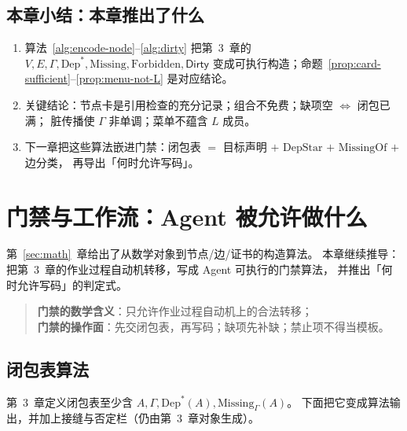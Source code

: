 \documentclass[UTF8,a4paper,11pt]{ctexart}
\theoremstyle{definition}
\theoremstyle{plain}
\theoremstyle{remark}
\numberwithin{figure}{section}
\numberwithin{table}{section}
\begin{document}
\subsection{本章小结：本章推出了什么}
\label{sec:math-summary}

\begin{enumerate}
  \item 算法~\ref{alg:encode-node}--\ref{alg:dirty} 把第~3~章的 $V,E,\Gamma,\mathrm{Dep}^*,\mathrm{Missing},\mathrm{Forbidden},\mathsf{Dirty}$
        变成可执行构造；命题~\ref{prop:card-sufficient}--\ref{prop:menu-not-L} 是对应结论。
  \item 关键结论：节点卡是引用检查的充分记录；组合不免费；缺项空 $\Leftrightarrow$ 闭包已满；
        脏传播使 $\Gamma$ 非单调；菜单不蕴含 $L$ 成员。
  \item 下一章把这些算法嵌进门禁：闭包表 $=$ 目标声明 $+$ $\mathrm{DepStar}$ $+$ $\mathrm{MissingOf}$ $+$ 边分类，
        再导出「何时允许写码」。
\end{enumerate}

\section{门禁与工作流：Agent 被允许做什么}
\label{sec:gates}

第~\ref{sec:math}~章给出了从数学对象到节点/边/证书的构造算法。
本章继续推导：把第~3~章的作业过程自动机转移，写成 Agent 可执行的门禁算法，
并推出「何时允许写码」的判定式。

\begin{quote}
\noindent
\textbf{门禁的数学含义}：只允许作业过程自动机上的合法转移；\\
\textbf{门禁的操作面}：先交闭包表，再写码；缺项先补缺；禁止项不得当模板。
\end{quote}

\subsection{闭包表算法}
\label{sec:gates-closure-algo}

第~3~章定义闭包表至少含 $A,\Gamma,\mathrm{Dep}^*(A),\mathrm{Missing}_\Gamma(A)$。
下面把它变成算法输出，并加上接缝与否定栏（仍由第~3~章对象生成）。
\end{document}
